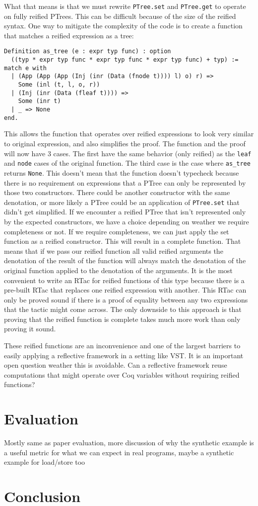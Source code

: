 \documentclass{puthesis}
\begin{document}
What that means is that we must rewrite \lstinline|PTree.set| and \lstinline|PTree.get|
to operate on fully reified PTrees. This can be difficult because of the size 
of the reified syntax. One way to mitigate the complexity of the code is to 
create a function that matches a reified expression as a tree:

\begin{lstlisting}
Definition as_tree (e : expr typ func) : option
  ((typ * expr typ func * expr typ func * expr typ func) + typ) := 
match e with
  | (App (App (App (Inj (inr (Data (fnode t)))) l) o) r) =>
    Some (inl (t, l, o, r))
  | (Inj (inr (Data (fleaf t)))) =>
    Some (inr t)
  | _ => None
end.
\end{lstlisting}

This allows the function that operates over reified expressions to look very
similar to original expression, and also simplifies the proof. The function
and the proof will now have 3 cases. The first have the same behavior (only reified)
as the \lstinline|leaf| and \lstinline|node| cases of the original function. The third
case is the case where \lstinline|as_tree| returns \lstinline|None|. This doesn't
mean that the function doesn't typecheck because there is no requirement on 
expressions that a PTree can only be represented by those two constructors. There
could be another constructor with the same denotation, or more likely a PTree
could be an application of \lstinline|PTree.set| that didn't get simplified.
If we encounter a reified PTree that isn't represented
only by the expected constructors, we have a choice depending on
weather we require completeness or not. If we require completeness,
we can just apply the set function as a reified constructor. This
will result in a complete function. That means that if we
pass our reified function all valid reified arguments
the denotation of the result of the function will always
match the denotation of the original function applied
to the denotation of the arguments. It is the most convenient
to write an RTac for reified functions of this type because
there is a pre-built RTac that replaces one reified expression
with another. This RTac can only be proved sound if there is a proof
of equality between any two expressions that the tactic might come
across. The only downside to this approach is that proving that the
reified function is complete takes much more work than only proving it
sound. 

These reified functions are an inconvenience and one of the largest
barriers to easily applying a reflective framework in a setting like
VST. It is an important open question weather this is avoidable. Can
a reflective framework reuse computations that might operate
over Coq variables without requiring reified functions? 

\chapter{Evaluation}

Mostly same as paper evaluation, more discussion of why the synthetic
example is a useful metric for what we can expect in real programs, 
maybe a synthetic example for load/store too

\chapter{Conclusion}



\end{document}
